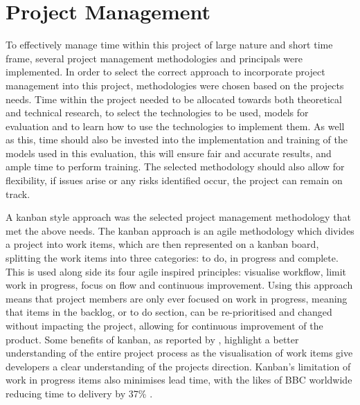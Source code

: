 \section{Project Management}
To effectively manage time within this project of large nature and short time frame, several project management methodologies and principals were implemented. In order to select the correct approach to incorporate project management into this project, methodologies were chosen based on the projects needs. Time within the project needed to be allocated towards both theoretical and technical research, to select the technologies to be used, models for evaluation and to learn how to use the technologies to implement them. As well as this, time should also be invested into the implementation and training of the models used in this evaluation, this will ensure fair and accurate results, and ample time to perform training. The selected methodology should also allow for flexibility, if issues arise or any risks identified occur, the project can remain on track.

A kanban style approach was the selected project management methodology that met the above needs. The kanban approach is an agile methodology which divides a project into work items, which are then represented on a kanban board, splitting the work items into three categories: to do, in progress and complete. This is used along side its four agile inspired principles: visualise workflow, limit work in progress, focus on flow and continuous improvement. Using this approach means that project members are only ever focused on work in progress, meaning that items in the backlog, or to do section, can be re-prioritised and changed without impacting the project, allowing for continuous improvement of the product. Some benefits of kanban, as reported by \cite{ahmad2013kanban}, highlight a better understanding of the entire project process as the visualisation of work items give developers a clear understanding of the projects direction. Kanban's limitation of work in progress items also minimises lead time, with the likes of BBC worldwide reducing time to delivery by 37\% \citep{senapathi2011factors}.

